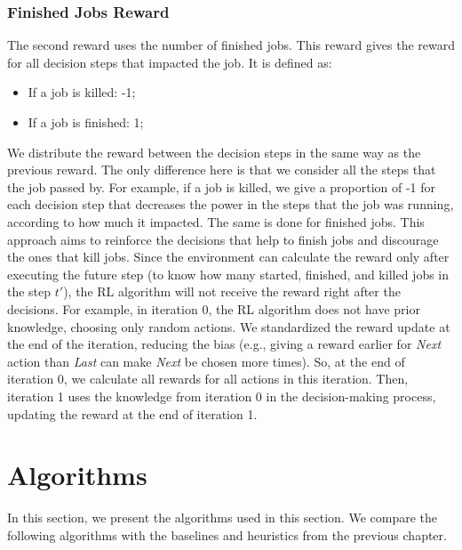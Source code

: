 \subsubsection{Finished Jobs Reward}

The second reward uses the number of finished jobs. This reward gives the reward for all decision steps that impacted the job. It is defined as:
\begin{itemize}
    \item If a job is killed: -1;
    \item If a job is finished: 1;
\end{itemize}

We distribute the reward between the decision steps in the same way as the previous reward. The only difference here is that we consider all the steps that the job passed by. For example, if a job is killed, we give a proportion of -1 for each decision step that decreases the power in the steps that the job was running, according to how much it impacted. The same is done for finished jobs. This approach aims to reinforce the decisions that help to finish jobs and discourage the ones that kill jobs. 
Since the environment can calculate the reward only after executing the future step (to know how many started, finished, and killed jobs in the step $t'$), the RL algorithm will not receive the reward right after the decisions. For example, in iteration 0, the RL algorithm does not have prior knowledge, choosing only random actions. We standardized the reward update at the end of the iteration, reducing the bias (e.g., giving a reward earlier for \emph{Next} action than \emph{Last} can make \emph{Next} be chosen more times). So, at the end of iteration 0, we calculate all rewards for all actions in this iteration. Then, iteration 1 uses the knowledge from iteration 0 in the decision-making process, updating the reward at the end of iteration 1.

\section{Algorithms}
\label{sec:RL_algos}
In this section, we present the algorithms used in this section. We compare the following algorithms with the baselines and heuristics from the previous chapter.

